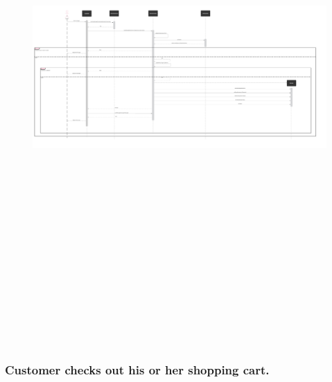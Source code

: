 \documentclass[]{article}
\begin{document}
\begin{figure}[H]
    \centering
    \includegraphics[height=8in]{./images/54.png}
\end{figure}

\hypertarget{customer-checks-out-his-or-her-shopping-cart.}{%
    \subsubsection{Customer checks out his or her shopping
        cart.}\label{customer-checks-out-his-or-her-shopping-cart.}}
\end{document}
